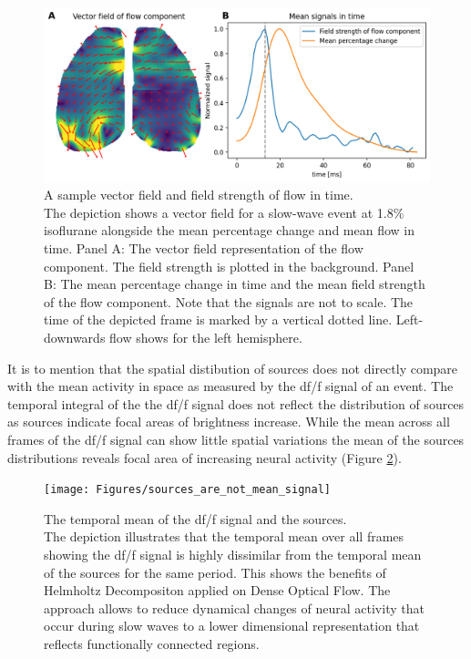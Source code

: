 \begin{figure}[!htb]
\centering
\includegraphics[width=\textwidth,height=\textheight,keepaspectratio]{Figures/vector_field_flow_component}
\decoRule
\caption[A sample vector field and field strength of flow in time.]{A sample vector field and field strength of flow in time.\\ The depiction shows a vector field for a slow-wave event at 1.8\% isoflurane alongside the mean percentage change and mean flow in time. Panel A: The vector field representation of the flow component. The field strength is plotted in the background. Panel B: The mean percentage change in time and the mean field strength of the flow component. Note that the signals are not to scale. The time of the depicted frame is marked by a vertical dotted line. Left-downwards flow shows for the left hemisphere.}
\label{fig:vector_field_flow_component}
\end{figure}
It is to mention that the spatial distibution of sources does not directly compare with the mean activity in space as measured by the df/f signal of an event. The temporal integral of the the df/f signal does not reflect the distribution of sources as sources indicate focal areas of brightness increase. While the mean across all frames of the df/f signal can show little spatial variations the mean of the sources distributions reveals focal area of increasing neural activity (Figure \ref{fig:sources_are_not_mean_signal}).\\
\begin{figure}[!htb]
\centering
\texttt{[image: Figures/sources\_are\_not\_mean\_signal]}
\decoRule
\caption[The temporal mean of the df/f signal and the sources]{The temporal mean of the df/f signal and the sources.\\ The depiction illustrates that the temporal mean over all frames showing the df/f signal is highly dissimilar from the temporal mean of the sources for the same period. This shows the benefits of Helmholtz Decompositon applied on Dense Optical Flow. The approach allows to reduce dynamical changes of neural activity that occur during slow waves to a lower dimensional representation that reflects functionally connected regions.}
\label{fig:sources_are_not_mean_signal}
\end{figure}
